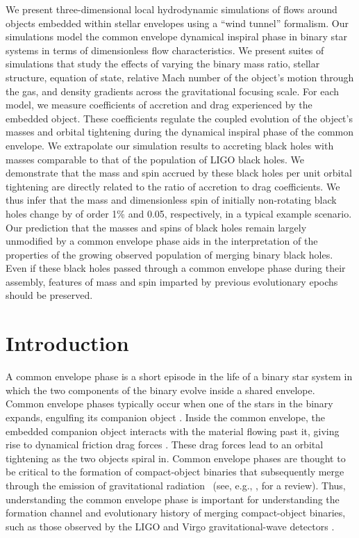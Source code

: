 We present three-dimensional local hydrodynamic simulations of flows around objects embedded within stellar envelopes using a ``wind tunnel'' formalism. Our simulations model the common envelope dynamical inspiral phase in binary star systems in terms of dimensionless flow characteristics. We present suites of simulations that study the effects of varying the binary mass ratio, stellar structure, equation of state, relative Mach number of the object's motion through the gas, and density gradients across the gravitational focusing scale. For each model, we measure coefficients of accretion and drag experienced by the embedded object. These coefficients regulate the coupled evolution of the object's masses and orbital tightening during the dynamical inspiral phase of the common envelope. We extrapolate our simulation results to accreting black holes with masses comparable to that of the population of LIGO black holes. We demonstrate that the mass and spin accrued by these black holes per unit orbital tightening are directly related to the ratio of accretion to drag coefficients. We thus infer that the mass and dimensionless spin of initially non-rotating black holes change by of order 1\% and 0.05, respectively, in a typical example scenario. Our prediction that the masses and spins of black holes remain largely unmodified by a common envelope phase aids in the interpretation of the properties of the growing observed population of merging binary black holes. Even if these black holes passed through a common envelope phase during their assembly, features of mass and spin imparted by previous evolutionary epochs should be preserved.

\section{Introduction} \label{sec:intro}
A common envelope phase is a short episode in the life of a binary star system in which the two components of the binary evolve inside a shared envelope. Common envelope phases typically occur when one of the stars in the binary expands, engulfing its companion object \cite{Paczynski:1976,1978ApJ...222..269T,1993PASP..105.1373I,2010NewAR..54...65T,2013A&ARv..21...59I,2017PASA...34....1D}. Inside the common envelope, the embedded companion object interacts with the material flowing past it, giving rise to dynamical friction drag forces \cite{1943ApJ....97..255C,1999ApJ...513..252O}. These drag forces lead to an orbital tightening as the two objects spiral in. 
Common envelope phases are thought to be critical to the formation of compact-object binaries that subsequently merge through the emission of gravitational radiation~\cite{Heuvel:1976,Smarr:1976} (see, e.g., \cite{Mandel:2018hfr}, for a review). Thus, understanding the common envelope phase is important for understanding the formation channel and evolutionary history of merging compact-object binaries, such as those observed by the LIGO and Virgo gravitational-wave detectors \cite{TheLIGOScientific:2014jea, TheVirgo:2014hva}.

